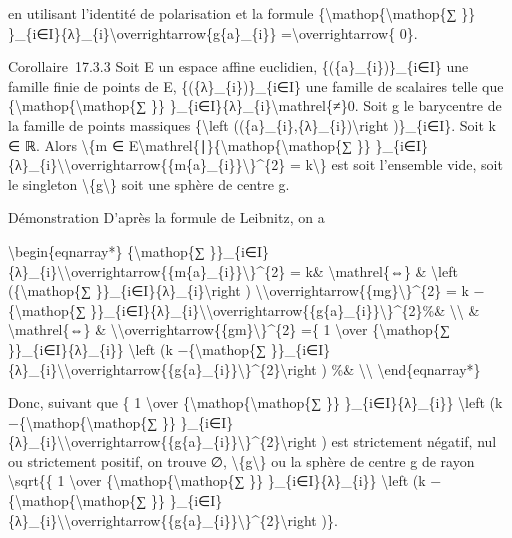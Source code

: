 \documentclass[]{article}
\begin{document}
en utilisant l'identité de polarisation et la formule
\{\textbackslash{}mathop\{\textbackslash{}mathop\{∑ \}\}
\}\_\{i∈I\}\{λ\}\_\{i\}\textbackslash{}overrightarrow\{g\{a\}\_\{i\}\}
=\textbackslash{}overrightarrow\{ 0\}.

Corollaire~17.3.3 Soit E un espace affine euclidien,
\{(\{a\}\_\{i\})\}\_\{i∈I\} une famille finie de points de E,
\{(\{λ\}\_\{i\})\}\_\{i∈I\} une famille de scalaires telle que
\{\textbackslash{}mathop\{\textbackslash{}mathop\{∑ \}\}
\}\_\{i∈I\}\{λ\}\_\{i\}\textbackslash{}mathrel\{≠\}0. Soit g le
barycentre de la famille de points massiques \{\textbackslash{}left
((\{a\}\_\{i\},\{λ\}\_\{i\})\textbackslash{}right )\}\_\{i∈I\}. Soit k ∈
ℝ. Alors \textbackslash{}\{m ∈
E\textbackslash{}mathrel\{∣\}\{\textbackslash{}mathop\{\textbackslash{}mathop\{∑
\}\}
\}\_\{i∈I\}\{λ\}\_\{i\}\textbackslash{}\textbar{}\textbackslash{}overrightarrow\{\{m\{a\}\_\{i\}\}\textbackslash{}\textbar{}\}\^{}\{2\}
= k\textbackslash{}\} est soit l'ensemble vide, soit le singleton
\textbackslash{}\{g\textbackslash{}\} soit une sphère de centre g.

Démonstration D'après la formule de Leibnitz, on a

\textbackslash{}begin\{eqnarray*\} \{\textbackslash{}mathop\{∑
\}\}\_\{i∈I\}\{λ\}\_\{i\}\textbackslash{}\textbar{}\textbackslash{}overrightarrow\{\{m\{a\}\_\{i\}\}\textbackslash{}\textbar{}\}\^{}\{2\}
= k\& \textbackslash{}mathrel\{⇔\} \& \textbackslash{}left
(\{\textbackslash{}mathop\{∑
\}\}\_\{i∈I\}\{λ\}\_\{i\}\textbackslash{}right )
\textbackslash{}\textbar{}\textbackslash{}overrightarrow\{\{mg\}\textbackslash{}\textbar{}\}\^{}\{2\}
= k −\{\textbackslash{}mathop\{∑
\}\}\_\{i∈I\}\{λ\}\_\{i\}\textbackslash{}\textbar{}\textbackslash{}overrightarrow\{\{g\{a\}\_\{i\}\}\textbackslash{}\textbar{}\}\^{}\{2\}\%\&
\textbackslash{}\textbackslash{} \& \textbackslash{}mathrel\{⇔\} \&
\textbackslash{}\textbar{}\textbackslash{}overrightarrow\{\{gm\}\textbackslash{}\textbar{}\}\^{}\{2\}
=\{ 1 \textbackslash{}over \{\textbackslash{}mathop\{∑
\}\}\_\{i∈I\}\{λ\}\_\{i\}\} \textbackslash{}left (k
−\{\textbackslash{}mathop\{∑
\}\}\_\{i∈I\}\{λ\}\_\{i\}\textbackslash{}\textbar{}\textbackslash{}overrightarrow\{\{g\{a\}\_\{i\}\}\textbackslash{}\textbar{}\}\^{}\{2\}\textbackslash{}right
) \%\& \textbackslash{}\textbackslash{} \textbackslash{}end\{eqnarray*\}

Donc, suivant que \{ 1 \textbackslash{}over
\{\textbackslash{}mathop\{\textbackslash{}mathop\{∑ \}\}
\}\_\{i∈I\}\{λ\}\_\{i\}\} \textbackslash{}left (k
−\{\textbackslash{}mathop\{\textbackslash{}mathop\{∑ \}\}
\}\_\{i∈I\}\{λ\}\_\{i\}\textbackslash{}\textbar{}\textbackslash{}overrightarrow\{\{g\{a\}\_\{i\}\}\textbackslash{}\textbar{}\}\^{}\{2\}\textbackslash{}right
) est strictement négatif, nul ou strictement positif, on trouve ∅,
\textbackslash{}\{g\textbackslash{}\} ou la sphère de centre g de rayon
\textbackslash{}sqrt\{\{ 1 \textbackslash{}over
\{\textbackslash{}mathop\{\textbackslash{}mathop\{∑ \}\}
\}\_\{i∈I\}\{λ\}\_\{i\}\} \textbackslash{}left (k
−\{\textbackslash{}mathop\{\textbackslash{}mathop\{∑ \}\}
\}\_\{i∈I\}\{λ\}\_\{i\}\textbackslash{}\textbar{}\textbackslash{}overrightarrow\{\{g\{a\}\_\{i\}\}\textbackslash{}\textbar{}\}\^{}\{2\}\textbackslash{}right
)\}.
\end{document}
